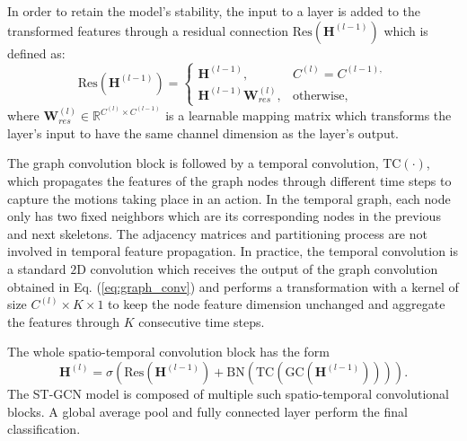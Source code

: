 \documentclass[journal]{IEEEtran}
\theoremstyle{definition}
\begin{document}
In order to retain the model's stability, the input to a layer is added to the transformed features through a residual connection $\text{Res}(\mathbf{H}^{(l-1)})$ which is defined as:
\begin{equation}
    \text{Res}(\mathbf{H}^{(l-1)}) = \begin{cases}\mathbf{H}^{(l-1)}, & C^{(l)} = C^{(l-1),}\\\mathbf{H}^{(l-1)}\mathbf{W}^{(l)}_{res}, & \text{otherwise,}\end{cases}
\end{equation}
where $\mathbf{W}^{(l)}_{res} \in \mathbb{R}^{C^{(l)} \times C^{(l-1)}}$ is a learnable mapping matrix which transforms the layer's input to have the same channel dimension as the layer's output.

The graph convolution block is followed by a temporal convolution, $\text{TC}(\cdot)$, which propagates the features of the graph nodes through different time steps to capture the motions taking place in an action. 
In the temporal graph, each node only has two fixed neighbors which are its corresponding nodes in the previous and next skeletons. The adjacency matrices and partitioning process are not involved in temporal feature propagation.
In practice, the temporal convolution is a standard $2$D convolution which receives the output of the graph convolution obtained in Eq. (\ref{eq:graph_conv}) and performs a transformation with a kernel of size $C^{(l)} \times K \times 1$ to keep the node feature dimension unchanged and aggregate the features through $K$ consecutive time steps. 

The whole spatio-temporal convolution block has the form
\begin{equation}
    \mathbf{H}^{(l)} = \sigma\left(\text{Res}(\mathbf{H}^{(l-1)}) + \text{BN}(\text{TC}(\text{GC}(\mathbf{H}^{(l-1)})))\right).
    \label{eq:spatio-temporal-block}
\end{equation}
The ST-GCN model is composed of multiple such spatio-temporal convolutional blocks. A global average pool and fully connected layer perform the final classification.
\end{document}
